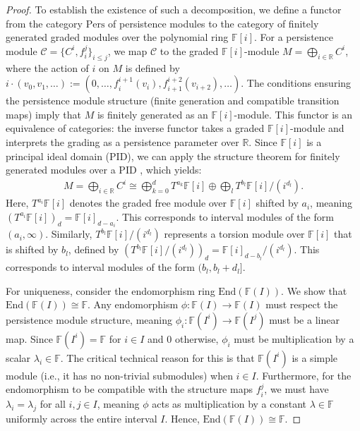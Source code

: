 \begin{proof}
To establish the existence of such a decomposition, we define a functor from the category $\mathrm{Pers}$ of persistence modules to the category of finitely generated graded modules over the polynomial ring $\mathbb{F}[i]$. For a persistence module $\mathcal{C} = \{C^i, f_{i}^j\}_{i \leq j}$, we map $\mathcal{C}$ to the graded $\mathbb{F}[i]$-module $M = \bigoplus_{i \in \mathbb{R}} C^i$, where the action of $i$ on $M$ is defined by $i \cdot (v_0, v_1, \ldots) := (0, \ldots, f_i^{i+1}(v_i), f_{i+1}^{i+2}(v_{i+2}), \ldots)$. The conditions ensuring the persistence module structure (finite generation and compatible transition maps) imply that $M$ is finitely generated as an $\mathbb{F}[i]$-module. This functor is an equivalence of categories: the inverse functor takes a graded $\mathbb{F}[i]$-module and interprets the grading as a persistence parameter over $\mathbb{R}$. Since $\mathbb{F}[i]$ is a principal ideal domain (PID), we can apply the structure theorem for finitely generated modules over a PID \cite[\S 2.1]{zomorodian2004computing}, which yields:
\begin{align}
	M = \bigoplus_{i \in \mathbb{R}} C^i \cong \bigoplus_{k=0}^d T^{a_k} \mathbb{F}[i] \oplus \bigoplus_l T^{b_l} \mathbb{F}[i] / (i^{d_l}).
\end{align}
Here, \( T^{a_i} \mathbb{F}[i] \) denotes the graded free module over \( \mathbb{F}[i] \) shifted by \( a_i \), meaning \( (T^{a_i} \mathbb{F}[i])_d = \mathbb{F}[i]_{d - a_i} \). This corresponds to interval modules of the form \( (a_i, \infty) \). Similarly, \( T^{b_l} \mathbb{F}[i] / (i^{d_l}) \) represents a torsion module over \( \mathbb{F}[i] \) that is shifted by \( b_l \), defined by \( (T^{b_l} \mathbb{F}[i] / (i^{d_l}))_d = \mathbb{F}[i]_{d - b_l} / (i^{d_l}) \). This corresponds to interval modules of the form \( (b_l, b_l + d_l] \). 

For uniqueness, consider the endomorphism ring $\text{End}(\mathbb{F}(I))$. We show that $\text{End}(\mathbb{F}(I)) \cong \mathbb{F}$. Any endomorphism $\phi: \mathbb{F}(I) \to \mathbb{F}(I)$ must respect the persistence module structure, meaning $\phi_i: \mathbb{F}(I^i) \to \mathbb{F}(I^j)$ must be a linear map. Since $\mathbb{F}(I^i) = \mathbb{F}$ for $i \in I$ and $0$ otherwise, $\phi_i$ must be multiplication by a scalar $\lambda_i \in \mathbb{F}$. The critical technical reason for this is that $\mathbb{F}(I^i)$ is a simple module (i.e., it has no non-trivial submodules) when $i \in I$. Furthermore, for the endomorphism to be compatible with the structure maps $f_{i}^j$, we must have $\lambda_i = \lambda_j$ for all $i, j \in I$, meaning $\phi$ acts as multiplication by a constant $\lambda \in \mathbb{F}$ uniformly across the entire interval $I$. Hence, $\text{End}(\mathbb{F}(I)) \cong \mathbb{F}$.


\end{proof}
